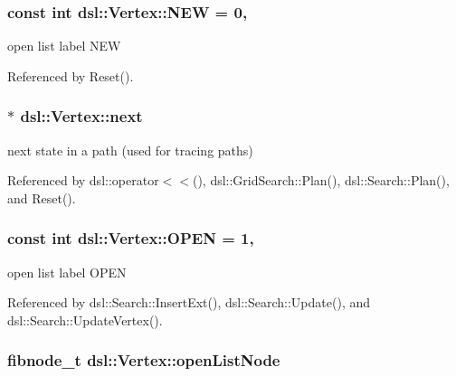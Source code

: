 \subsubsection[{N\-E\-W}]{\setlength{\rightskip}{0pt plus 5cm}const int dsl\-::\-Vertex\-::\-N\-E\-W = 0\hspace{0.3cm}{\ttfamily [static]}, {\ttfamily [protected]}}\label{classdsl_1_1Vertex_a44275282e5f7b0be43bcc153621f1f6d}


open list label N\-E\-W 



Referenced by Reset().

\subsubsection[{next}]{$\ast$ dsl\-::\-Vertex\-::next}\label{classdsl_1_1Vertex_a8d1304ddb4aac965291b30f25d8a24a4}


next state in a path (used for tracing paths) 



Referenced by dsl\-::operator$<$$<$(), dsl\-::\-Grid\-Search\-::\-Plan(), dsl\-::\-Search\-::\-Plan(), and Reset().

\subsubsection[{O\-P\-E\-N}]{\setlength{\rightskip}{0pt plus 5cm}const int dsl\-::\-Vertex\-::\-O\-P\-E\-N = 1\hspace{0.3cm}{\ttfamily [static]}, {\ttfamily [protected]}}\label{classdsl_1_1Vertex_a76be5b53d16bd35ef36992609b05b5e1}


open list label O\-P\-E\-N 



Referenced by dsl\-::\-Search\-::\-Insert\-Ext(), dsl\-::\-Search\-::\-Update(), and dsl\-::\-Search\-::\-Update\-Vertex().

\subsubsection[{open\-List\-Node}]{\setlength{\rightskip}{0pt plus 5cm}fibnode\-\_\-t dsl\-::\-Vertex\-::open\-List\-Node\hspace{0.3cm}{\ttfamily [protected]}}\label{classdsl_1_1Vertex_a407f820d27408e3716ca42347d3a432f}


